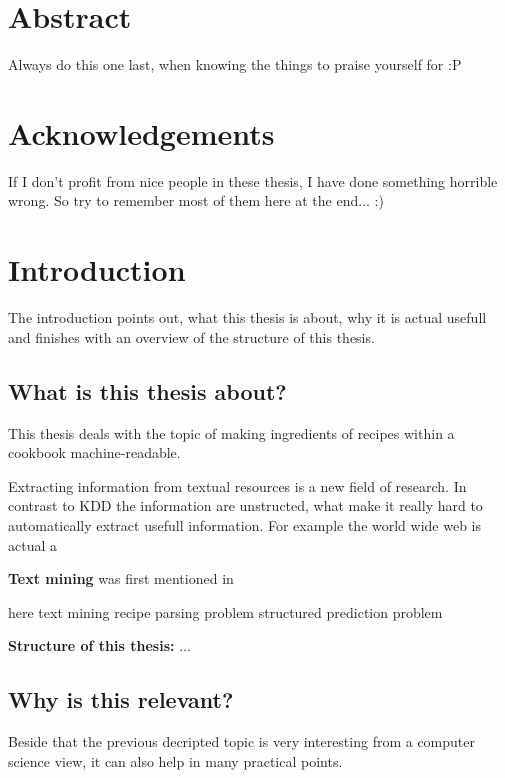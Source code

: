 \documentclass[12pt, twoside]{report}
\begin{document}


\chapter*{Abstract}
Always do this one last, when knowing the things to praise  yourself for :P

\chapter*{Acknowledgements}
If I don't profit from nice people in these thesis, I have done something horrible wrong. So try to remember most of them here at the end... :)

\tableofcontents



\chapter{Introduction}
\parencite{surveyOfTextMining}

The introduction points out, what this thesis is about, why it is actual usefull and finishes with an overview of the structure of this thesis.

\section{What is this thesis about?}
This thesis deals with the topic of making ingredients of recipes within a cookbook machine-readable.

Extracting information from textual resources is a new field of research. In contrast to KDD the information are unstructed, what make it really hard to automatically extract usefull information. For example the world wide web is actual  a

\textbf{Text mining} was first mentioned in \parencite{KDT}


here text mining
recipe parsing problem 
structured prediction problem 



\textbf{Structure of this thesis:} ...
\section{Why is this relevant?}
Beside that the previous decripted topic is very interesting from a computer science view, it can also help in many practical points.
\end{document}
